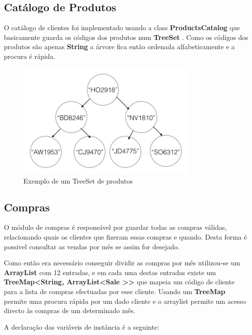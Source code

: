 \documentclass[10pt] {article}
\begin{document}
\newpage
\subsection{Catálogo de Produtos\label{catalogoprodutos}}

O catálogo de clientes foi implementado usando a class \color{blue} \textbf{ProductsCatalog} \color{black} que basicamente 
guarda os códigos dos produtos num \color{blue} \textbf{TreeSet} \color{black}.
Como os códigos dos produtos são apenas \color{blue} \textbf{String} \color{black} a árvore fica então ordenada alfabeticamente e a procura é rápida.

\begin{figure}[ht!]
\centering
\includegraphics[width=90mm]{catprodutos.png}
\caption{Exemplo de um TreeSet de produtos}
\label{fig:catprodutos}
\end{figure}

\subsection{Compras\label{compras}}

O módulo de compras é responsável por guardar todas as compras válidas, relacionando quais os clientes que fizeram essas compras e quando.
Desta forma é possivel consultar as vendas por mês se assim for desejado.

Como então era necessário conseguir dividir as compras por mês utilizou-se um \color{blue} \textbf{ArrayList} \color{black} com 
12 entradas, e em cada uma destas entradas existe um \color{blue} \textbf{TreeMap\textless String, ArrayList\textless Sale
\textgreater\textgreater} \color{black} que mapeia um código de cliente para a lista de compras efectuadas por esse cliente.
Usando um \color{blue} \textbf{TreeMap} \color{black} permite uma procura rápida por um dado cliente e o arraylist permite um 
acesso directo às compras de um determinado mês.

A declaração das variáveis de instância é a seguinte:
\end{document}
